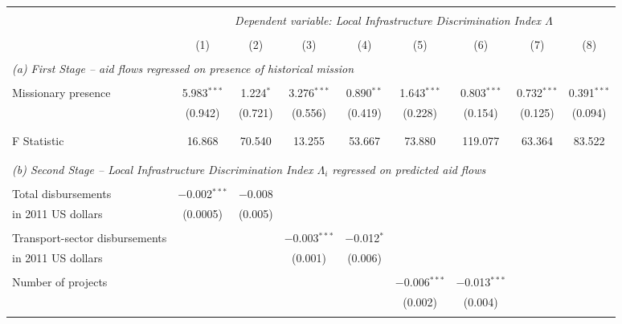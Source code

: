 \documentclass[11pt, oneside]{article}   	%
\begin{document}
\begin{table}[!h]
{  \begin{tabular}{@{\extracolsep{5pt}}lcccccccc}
  \\[-1.8ex]\hline
  \hline \\[-1.8ex]
     & \multicolumn{8}{c}{\textit{Dependent variable: Local Infrastructure Discrimination Index $\Lambda$}} \\
       \cline{2-9}
  \\[-1.8ex] & (1) & (2) & (3) & (4) & (5) & (6) & (7) & (8)\\
  \hline \\[-1.8ex]
  \multicolumn{9}{l}{\textit{(a) First Stage -- aid flows regressed on presence of historical mission}} \\
  \\[-1.8ex]
  Missionary presence & 5.983$^{***}$ & 1.224$^{*}$ & 3.276$^{***}$ & 0.890$^{**}$ & 1.643$^{***}$ & 0.803$^{***}$ & 0.732$^{***}$ & 0.391$^{***}$ \\
   & (0.942) & (0.721) & (0.556) & (0.419) & (0.228) & (0.154) & (0.125) & (0.094) \\
   & & & & & & & & \\
 \\[-1.8ex]
 F Statistic & 16.868 & 70.540& 13.255 & 53.667 & 73.880 & 119.077& 63.364& 83.522\\
 \hline \\[-1.8ex]
 \\[-1.8ex]
\multicolumn{9}{l}{\textit{(b) Second Stage -- Local Infrastructure Discrimination Index $\Lambda_{i}$ regressed on predicted aid flows}} \\
\\[-1.8ex]
Total disbursements & $-$0.002$^{***}$ & $-$0.008 &  &  &  &  &  &  \\
\hspace*{3mm} in 2011 US dollars & (0.0005) & (0.005) &  &  &  &  &  &  \\
 & & & & & & & & \\
Transport-sector disbursements &  &  & $-$0.003$^{***}$ & $-$0.012$^{*}$ &  &  &  &  \\
\hspace*{3mm} in 2011 US dollars &  &  & (0.001) & (0.006) &  &  &  &  \\
 & & & & & & & & \\
Number of projects &  &  &  &  & $-$0.006$^{***}$ & $-$0.013$^{***}$ &  &  \\
 &  &  &  &  & (0.002) & (0.004) &  &  \\
 & & & & & & & & \\

\end{tabular}}
\end{table}
\end{document}
